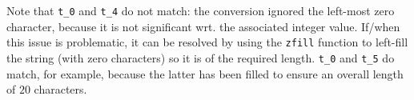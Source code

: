 \noindent
Note that 
\lstinline[language={Python}]|t_0| 
and 
\lstinline[language={Python}]|t_4| 
do not match: 
the conversion ignored the left-most zero character, because it is not
significant wrt. the associated integer value.  
If/when this issue is problematic, it can be resolved by using the
\lstinline[language={Python}]|zfill| 
function to left-fill the string (with zero characters) so it is of the 
required length.
\lstinline[language={Python}]|t_0| 
and
\lstinline[language={Python}]|t_5| 
do     match,
for example,
because the latter has been filled to ensure an overall length of $20$ 
characters.

